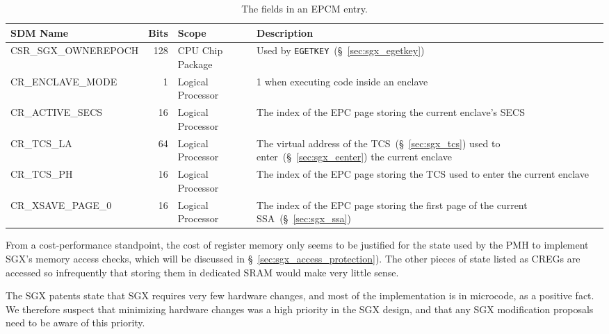 

\begin{table*}[hbt]
  \centering
  \begin{tabularx}{\textwidth}{| l | r | l | X |}
  \hline
  \textbf{SDM Name} & \textbf{Bits} & \textbf{Scope} & \textbf{Description} \\
  \hline
  CSR\_SGX\_OWNEREPOCH & 128 & CPU Chip Package &
      Used by \texttt{EGETKEY}~(\S~\ref{sec:sgx_egetkey}) \\
  \hline
  CR\_ENCLAVE\_MODE & 1 & Logical Processor & 1 when executing code inside an
      enclave \\
  \hline
  CR\_ACTIVE\_SECS & 16 & Logical Processor & The index of the EPC page storing
      the current enclave's SECS \\
  \hline
  CR\_TCS\_LA & 64 & Logical Processor & The virtual address of the
      TCS~(\S~\ref{sec:sgx_tcs}) used to enter~(\S~\ref{sec:sgx_eenter}) the
      current enclave \\
  \hline
  CR\_TCS\_PH & 16 & Logical Processor & The index of the EPC page storing the
      TCS used to enter the current enclave \\
  \hline
  CR\_XSAVE\_PAGE\_0 & 16 & Logical Processor & The index of the EPC page
      storing the first page of the current SSA~(\S~\ref{sec:sgx_ssa}) \\
  \hline
  \end{tabularx}
  \caption{
    The fields in an EPCM entry.
  }
  \label{fig:sgx_registers}
\end{table*}

From a cost-performance standpoint, the cost of register memory only seems to
be justified for the state used by the PMH to implement SGX's memory access
checks, which will be discussed in \S~\ref{sec:sgx_access_protection}). The
other pieces of state listed as CREGs are accessed so infrequently that storing
them in dedicated SRAM would make very little sense.

The SGX patents state that SGX requires very few hardware changes, and most of
the implementation is in microcode, as a positive fact. We therefore suspect
that minimizing hardware changes was a high priority in the SGX design, and
that any SGX modification proposals need to be aware of this priority.
